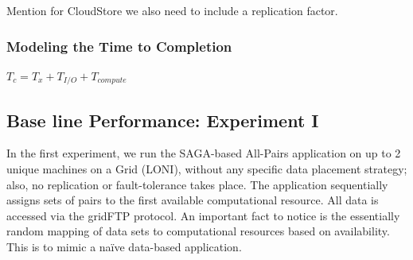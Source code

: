 \documentclass{rspublic}
\begin{document}
Mention for CloudStore we also need to include a replication factor.

\subsubsection{Modeling the Time to Completion}

$T_c = T_x + T_{I/O} + T_{compute}$

\subsection{Base line Performance: Experiment I} In the first
experiment, we run the SAGA-based All-Pairs application on up to 2
unique machines on a Grid (LONI), without any specific data placement
strategy; also, no replication or fault-tolerance takes place.  The
application sequentially assigns sets of pairs to the first available
computational resource.  All data is accessed via the gridFTP protocol.
An important fact to notice is the essentially random mapping of data
sets to computational resources based on availability.  This is to mimic
a naïve data-based application.
\end{document}
